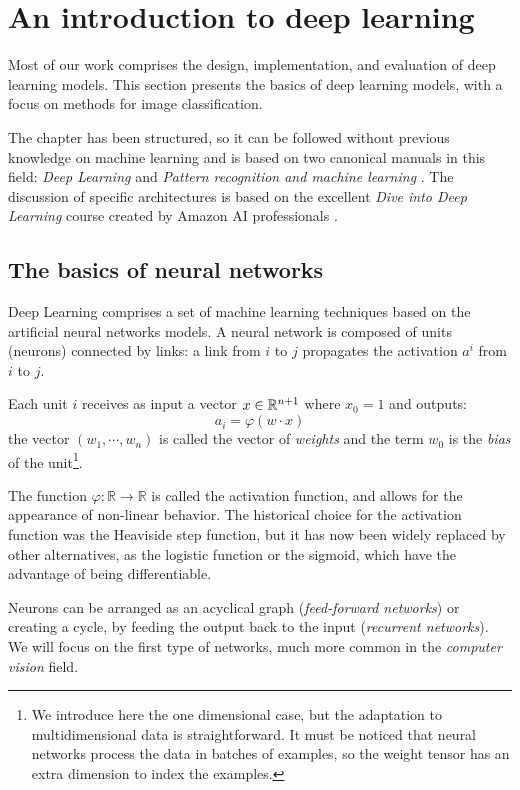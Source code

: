 \chapter{An introduction to deep learning} \label{chapter2}
Most of our work comprises the design, implementation, and evaluation of deep learning models. This section presents the basics of deep learning models, with a focus on methods for image classification. 

The chapter has been structured, so it can be followed without previous knowledge on machine learning and is based on two canonical manuals in this field: \textit{Deep Learning} \cite{goodfellow2016deep} and \textit{Pattern recognition and machine learning} \cite{bishop2006pattern}. The discussion of specific architectures is based on the excellent \textit{Dive into Deep Learning} course created by Amazon AI professionals \cite{zhang2021dive}.

\section{The basics of neural networks}
Deep Learning comprises a set of machine learning techniques based on the artificial neural networks models. A neural network is composed of units (neurons) connected by links: a link from \( i \) to \( j \) propagates the activation \( a^i \) from \( i \) to \( j \).

Each unit \( i \) receives as input a vector \( x \in \mathbb{R}^{n+1} \) where \( x_0 = 1 \) and outputs:
\[ a_i = \varphi \left( w \cdot x\right)\]
the vector \( (w_1, \cdots, w_n) \) is called the vector of \textit{weights} and the term \( w_0 \) is the \textit{bias} of the unit\footnote{We introduce here the one dimensional case, but the adaptation to multidimensional data is straightforward. It must be noticed that neural networks process the data in batches of examples, so the weight tensor has an extra dimension to index the examples.}.

The function \( \varphi: \mathbb{R} \to \mathbb{R} \) is called the activation function, and allows for the appearance of non-linear behavior. The historical choice for the activation function was the Heaviside step function, but it has now been widely replaced by other alternatives, as the logistic function or the sigmoid, which have the advantage of being differentiable.

Neurons can be arranged as an acyclical graph (\textit{feed-forward networks}) or creating a cycle, by feeding the output back to the input (\textit{recurrent networks}). We will focus on the first type of networks, much more common in the \textit{computer vision} field.

